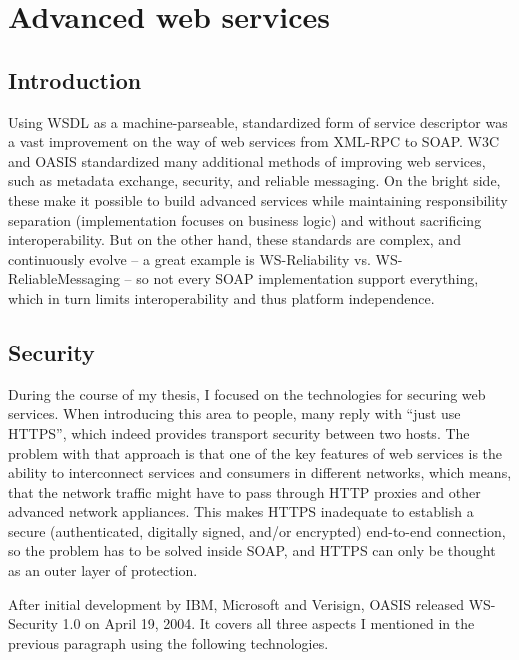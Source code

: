 \section{Advanced web services}

\subsection{Introduction}

Using WSDL as a machine-parseable, standardized form of service descriptor was a vast improvement on the way of web services from XML-RPC to SOAP. W3C and OASIS standardized many additional methods of improving web services, such as metadata exchange, security, and reliable messaging. On the bright side, these make it possible to build advanced services while maintaining responsibility separation (implementation focuses on business logic) and without sacrificing interoperability. But on the other hand, these standards are complex, and continuously evolve -- a great example is WS-Reliability vs. WS-ReliableMessaging -- so not every SOAP implementation support everything, which in turn limits interoperability and thus platform independence.

\subsection{Security}

During the course of my thesis, I focused on the technologies for securing web services. When introducing this area to people, many reply with ``just use HTTPS'', which indeed provides transport security between two hosts. The problem with that approach is that one of the key features of web services is the ability to interconnect services and consumers in different networks, which means, that the network traffic might have to pass through HTTP proxies and other advanced network appliances. This makes HTTPS inadequate to establish a secure (authenticated, digitally signed, and/or encrypted) end-to-end connection, so the problem has to be solved inside SOAP, and HTTPS can only be thought as an outer layer of protection.

After initial development by IBM, Microsoft and Verisign, OASIS released WS-Security 1.0 on April 19, 2004. It covers all three aspects I mentioned in the previous paragraph using the following technologies.

